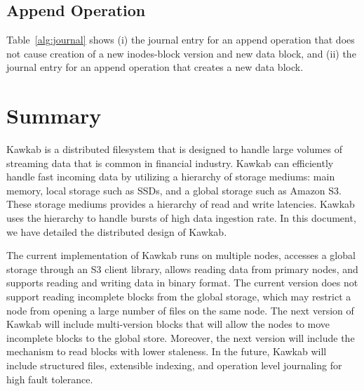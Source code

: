 \documentclass[]{article}
\begin{document}
\subsection{Append Operation}

Table~\ref{alg:journal} shows (i) the journal entry for an append operation that does not cause creation
of a new inodes-block version and new data block, and (ii) the journal entry for an append
operation that creates a new data block.




\section{Summary}
Kawkab is a distributed filesystem that is designed to handle large volumes
of streaming data that is common in financial industry. Kawkab can efficiently
handle fast incoming data by utilizing a hierarchy of storage mediums:
main memory, local storage such as SSDs, and a global storage such as Amazon S3.
These storage mediums provides a hierarchy of read and write latencies.
Kawkab uses the hierarchy to handle bursts of high data ingestion rate.
In this document, we have detailed the distributed design of Kawkab.

The current implementation of Kawkab runs on multiple nodes, accesses
a global storage through an S3 client library, allows reading data from
primary nodes, and supports reading and writing data in binary format.
The current version does not support reading incomplete blocks from the
global storage, which may restrict a node from opening a large number
of files on the same node.
The next version of Kawkab will include multi-version blocks that
will allow the nodes to move incomplete blocks to the global store. Moreover,
the next version will include the mechanism to read blocks with lower
staleness. In the future, Kawkab will include structured files, extensible
indexing, and operation level journaling for high fault tolerance.




%
%
%
%
%
\end{document}
